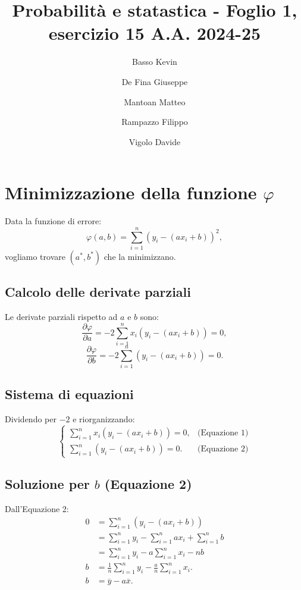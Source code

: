 \documentclass[a4paper]{report}
\title{Probabilità e statastica - Foglio 1, esercizio 15 A.A. 2024-25}
\author{Basso Kevin
        \and De Fina Giuseppe
        \and Mantoan Matteo
        \and Rampazzo Filippo
        \and Vigolo Davide}
\begin{document}
\maketitle
\tableofcontents

\newpage

\section{Minimizzazione della funzione \(\varphi\)}

Data la funzione di errore:
\[
\varphi(a, b) = \sum_{i=1}^n \left( y_i - (a x_i + b) \right)^2,
\]
vogliamo trovare \( (a^*, b^*) \) che la minimizzano.

\subsection{Calcolo delle derivate parziali}

Le derivate parziali rispetto ad \( a \) e \( b \) sono:
\[
\frac{\partial \varphi}{\partial a} = -2 \sum_{i=1}^n x_i \left( y_i - (a x_i + b) \right) = 0,
\]
\[
\frac{\partial \varphi}{\partial b} = -2 \sum_{i=1}^n \left( y_i - (a x_i + b) \right) = 0.
\]

\subsection{Sistema di equazioni}

Dividendo per \(-2\) e riorganizzando:
\[
\begin{cases}
\displaystyle \sum_{i=1}^n x_i \left( y_i - (a x_i + b) \right) = 0, & \text{(Equazione 1)} \\
\displaystyle \sum_{i=1}^n \left( y_i - (a x_i + b) \right) = 0.
& \text{(Equazione 2)}
\end{cases}
\]

\subsection{Soluzione per \( b \) (Equazione 2)}

Dall'Equazione 2:
\begin{align*}
0 &= \sum_{i=1}^{n} \left( y_i - (a x_i + b) \right) \\
&= \sum_{i=1}^{n} y_i - \sum_{i=1}^{n} a x_i + \sum_{i=1}^{n} b \\
&= \sum_{i=1}^{n} y_i - a \sum_{i=1}^{n} x_i - n b\\
b &= \frac{1}{n} \sum_{i=1}^{n} y_i - \frac{a}{n} \sum_{i=1}^{n} x_i. \\
b &= \overline{y}- a \overline{x}.
\end{align*}
\end{document}
